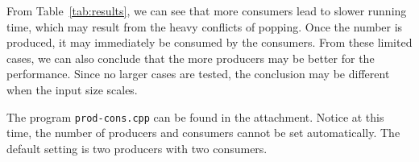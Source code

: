 \documentclass[english]{thesis}
\begin{document}
From Table~\ref{tab:results}, we can see that more consumers lead to slower running time, which may result from the heavy conflicts of popping.
Once the number is produced, it may immediately be consumed by the consumers.
From these limited cases, we can also conclude that the more producers may be better for the performance.
Since no larger cases are tested, the conclusion may be different when the input size scales.

The program \verb'prod-cons.cpp' can be found in the attachment.
Notice at this time, the number of producers and consumers cannot be set automatically.
The default setting is two producers with two consumers.
\end{document}
